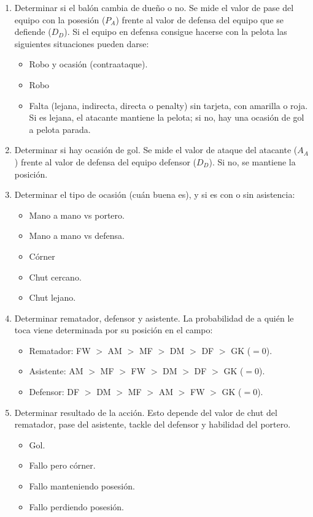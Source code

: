 \documentclass[a4paper,9pt]{article}
\begin{document}
\begin{enumerate}
\item Determinar si el bal\'on cambia de dueño o no. Se mide el valor de pase del equipo con la posesi\'on ($P_A$) frente al valor de defensa del equipo que se defiende ($D_D$). Si el equipo en defensa consigue hacerse con la pelota las siguientes situaciones pueden darse:
\begin{itemize}
\item Robo y ocasi\'on (contraataque).
\item Robo
\item Falta (lejana, indirecta, directa o penalty) sin tarjeta, con amarilla o roja. Si es lejana, el atacante mantiene la pelota; si no, hay una ocasi\'on de gol a pelota parada.
\end{itemize}
\item Determinar si hay ocasi\'on de gol. Se mide el valor de ataque del atacante ($A_A$) frente al valor de defensa del equipo defensor ($D_D$). Si no, se mantiene la posici\'on.
\item Determinar el tipo de ocasi\'on (cu\'an buena es), y si es con o sin asistencia:
\begin{itemize}
\item Mano a mano vs portero.
\item Mano a mano vs defensa.
\item C\'orner
\item Chut cercano.
\item Chut lejano.
\end{itemize}
\item Determinar rematador, defensor y asistente. La probabilidad de a qui\'en le toca viene determinada por su posici\'on en el campo:
\begin{itemize}
\item Rematador: FW $>$ AM $>$ MF $>$ DM $>$ DF $>$ GK ($=0$).
\item Asistente: AM $>$ MF $>$ FW $>$ DM $>$ DF $>$ GK ($=0$).
 \item Defensor: DF $>$ DM $>$ MF $>$ AM $>$ FW $>$ GK ($=0$).
\end{itemize}
\item Determinar resultado de la acci\'on. Esto depende del valor de chut del rematador, pase del asistente, tackle del defensor y habilidad del portero.
\begin{itemize}
\item Gol.
\item Fallo pero c\'orner.
\item Fallo manteniendo posesi\'on.
\item Fallo perdiendo posesi\'on.
\end{itemize}
\end{enumerate}
\end{document}
